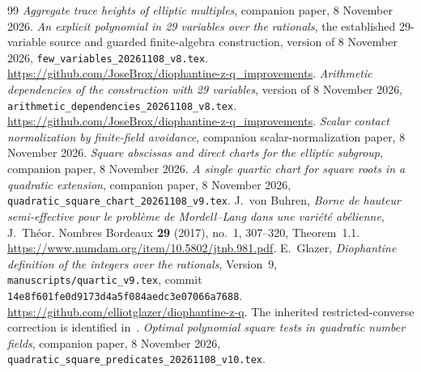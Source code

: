 \documentclass[11pt,a4paper]{article}
\begin{document}
\begin{thebibliography}{99}
\emph{Aggregate trace heights of elliptic multiples},
companion paper, 8 November 2026.
\emph{An explicit polynomial in 29 variables over the rationals},
the established 29-variable source and guarded finite-algebra
construction, version of 8 November 2026,
\nolinkurl{few_variables_20261108_v8.tex}.
\url{https://github.com/JoseBrox/diophantine-z-q_improvements}.
\emph{Arithmetic dependencies of the construction with 29 variables},
version of 8 November 2026,
\nolinkurl{arithmetic_dependencies_20261108_v8.tex}.
\url{https://github.com/JoseBrox/diophantine-z-q_improvements}.
\emph{Scalar contact normalization by finite-field avoidance},
companion scalar-normalization paper, 8 November 2026.
\emph{Square abscissas and direct charts for the elliptic subgroup},
companion paper, 8 November 2026.
\emph{A single quartic chart for square roots in a quadratic extension},
companion paper, 8 November 2026,
\nolinkurl{quadratic_square_chart_20261108_v9.tex}.
J.~von Buhren,
\emph{Borne de hauteur semi-effective pour le probl\`eme de
Mordell--Lang dans une vari\'et\'e ab\'elienne},
J.~Th\'eor. Nombres Bordeaux \textbf{29} (2017), no.~1,
307--320, Theorem~1.1.
\url{https://www.numdam.org/item/10.5802/jtnb.981.pdf}.
E.~Glazer, \emph{Diophantine definition of the integers over the
rationals}, Version~9, \nolinkurl{manuscripts/quartic_v9.tex},
commit \nolinkurl{14e8f601fe0d9173d4a5f084aedc3e07066a7688}.
\url{https://github.com/elliotglazer/diophantine-z-q}.
The inherited restricted-converse correction is identified
in~\cite{Dependencies}.
\emph{Optimal polynomial square tests in quadratic number fields},
companion paper, 8 November 2026,
\nolinkurl{quadratic_square_predicates_20261108_v10.tex}.
\end{thebibliography}
\end{document}
